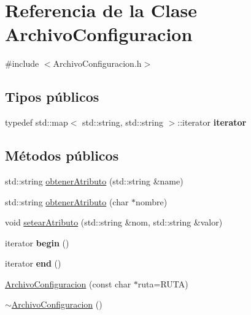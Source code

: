 \hypertarget{classArchivoConfiguracion}{\section{\-Referencia de la \-Clase \-Archivo\-Configuracion}
\label{classArchivoConfiguracion}
}


{\ttfamily \#include $<$\-Archivo\-Configuracion.\-h$>$}

\subsection*{\-Tipos públicos}
\begin{DoxyCompactItemize}
\item 
\hypertarget{classArchivoConfiguracion_ab833c19535774fe9d0221c7168ee76be}{typedef std\-::map$<$ std\-::string, \*
std\-::string $>$\-::iterator {\bfseries iterator}}\label{classArchivoConfiguracion_ab833c19535774fe9d0221c7168ee76be}

\end{DoxyCompactItemize}
\subsection*{\-Métodos públicos}
\begin{DoxyCompactItemize}
\item 
std\-::string \hyperlink{classArchivoConfiguracion_a95768ee9e7dbbbfe5569bc2184af3ee8}{obtener\-Atributo} (std\-::string \&name)
\item 
std\-::string \hyperlink{classArchivoConfiguracion_ad6205cb38e5a6453ef98a772c4e198dd}{obtener\-Atributo} (char $\ast$nombre)
\item 
void \hyperlink{classArchivoConfiguracion_a197987be642dd81cb57d6f96cbd08873}{setear\-Atributo} (std\-::string \&nom, std\-::string \&valor)
\item 
\hypertarget{classArchivoConfiguracion_adf342e6c4d4dc3aa48c08f8b623a7ac1}{iterator {\bfseries begin} ()}\label{classArchivoConfiguracion_adf342e6c4d4dc3aa48c08f8b623a7ac1}

\item 
\hypertarget{classArchivoConfiguracion_a38b2a659a848866e48b237a0edefede5}{iterator {\bfseries end} ()}\label{classArchivoConfiguracion_a38b2a659a848866e48b237a0edefede5}

\item 
\hyperlink{classArchivoConfiguracion_acee8a865caeee4ab8dad8e799f776717}{\-Archivo\-Configuracion} (const char $\ast$ruta=\-R\-U\-T\-A)
\item 
\hyperlink{classArchivoConfiguracion_a18138422c075e0090c98978089ac91b0}{$\sim$\-Archivo\-Configuracion} ()
\end{DoxyCompactItemize}


